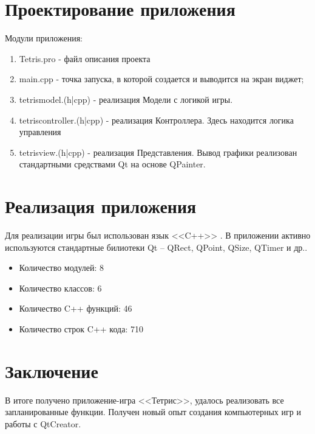 \documentclass[a4paper,12pt]{article}
\begin{document}
\section{Проектирование приложения}

Модули приложения:

\begin{enumerate}
    \item Tetris.pro - файл описания проекта
    \item main.cpp - точка запуска, в которой создается и выводится на экран виджет;
    \item tetrismodel.(h|cpp) - реализация Модели с логикой игры.
    \item tetriscontroller.(h|cpp) - реализация Контроллера. Здесь находится логика управления
    \item tetrisview.(h|cpp) - реализация Представления. Вывод графики реализован стандартными средствами Qt на основе QPainter.
\end{enumerate}


\section{Реализация приложения}

Для реализации игры был использован язык <<C++>> . В приложении активно используются стандартные билиотеки Qt -- QRect, QPoint, QSize, QTimer и др..
\begin{itemize}
    \item Количество модулей: 8
    \item Количество классов: 6
    \item Количество C++ функций: 46
    \item Количество строк C++ кода: 710
\end{itemize}



\newpage
\section*{Заключение}
В итоге получено приложение-игра <<Тетрис>>, удалось реализовать все запланированные функции. Получен новый опыт создания компьютерных игр и работы с QtCreator.
\end{document}

